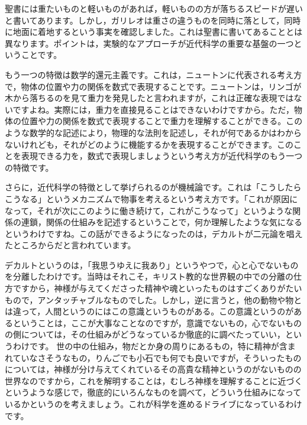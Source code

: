 \documentclass{ltjsbook}
\begin{document}
聖書には重たいものと軽いものがあれば，軽いものの方が落ちるスピードが遅いと書いてあります。しかし，ガリレオは重さの違うものを同時に落として，同時に地面に着地するという事実を確認しました。これは聖書に書いてあることとは異なります。ポイントは，実験的なアプローチが近代科学の重要な基盤の一つということです。

もう一つの特徴は数学的還元主義です。これは，ニュートンに代表される考え方で，物体の位置や力の関係を数式で表現することです。ニュートンは，リンゴが木から落ちるのを見て重力を発見したと言われますが，これは正確な表現ではないですよね。実際には，重力を直接見ることはできないわけですから。ただ，物体の位置や力の関係を数式で表現することで重力を理解することができる。このような数学的な記述により，物理的な法則を記述し，それが何であるかはわからないけれども，それがどのように機能するかを表現することができます。このことを表現できる力を，数式で表現しましょうという考え方が近代科学のもう一つの特徴です。

さらに，近代科学の特徴として挙げられるのが機械論です。これは「こうしたらこうなる」というメカニズムで物事を考えるという考え方です。「これが原因になって，それが次にこのように働き続けて，これがこうなって」というような関係の連鎖，関係の仕組みを記述するということで，何か理解したような気になるというわけですね。この話ができるようになったのは，デカルトが二元論を唱えたところからだと言われています。

デカルトというのは，「我思うゆえに我あり」というやつで，心と心でないものを分離したわけです。当時はそれこそ，キリスト教的な世界観の中での分離の仕方ですから，神様が与えてくださった精神や魂といったものはすごくありがたいもので，アンタッチャブルなものでした。しかし，逆に言うと，他の動物や物とは違って，人間というのにはこの意識というものがある。この意識というのがあるということは，ここが大事なことなのですが，意識でないもの，心でないものの側については，その仕組みがどうなっているか徹底的に調べたっていい，というわけです。
世の中の仕組み，物だとか身の周りにあるもの，特に精神が含まれていなさそうなもの，りんごでも小石でも何でも良いですが，そういったものについては，神様が分け与えてくれているその高貴な精神というのがないものの世界なのですから，これを解明することは，むしろ神様を理解することに近づくというような感じで，徹底的にいろんなものを調べて，どういう仕組みになっているかというのを考えましょう。これが科学を進めるドライブになっているわけです。
\end{document}
